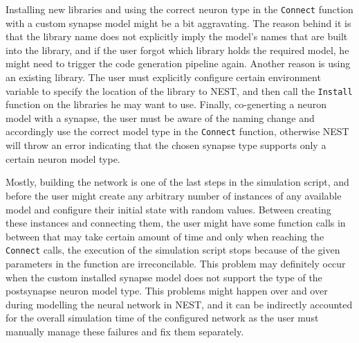   Installing new libraries and using the correct neuron type in the \texttt{Connect} function with a custom synapse model might be a bit aggravating. The reason behind it is that the library name does not explicitly imply the model's names that are built into the library, and if the user forgot which library holds the required model, he might need to trigger the code generation pipeline again. Another reason is using an existing library. The user must explicitly configure certain environment variable to specify the location of the library to NEST, and then call the \texttt{Install} function on the libraries he may want to use. Finally,  co-generting a neuron model with a synapse, the user must be aware of the naming change and accordingly use the correct model type in the \texttt{Connect} function, otherwise NEST will throw an error indicating that the chosen synapse type supports only a certain neuron model type.
  
  Mostly, building the network is one of the last steps in the simulation script, and before the user might create any arbitrary number of instances of any available model and configure their initial state with random values. Between creating these instances and connecting them, the user might have some function calls in between that may take certain amount of time and only when reaching the \texttt{Connect} calls, the execution of the simulation script stops because of the given parameters in the function are irreconcilable. This problem may definitely occur when the custom installed synapse model does not support the type of the postsynapse neuron model type.  This problems might happen over and over during modelling the neural network in NEST, and it can be indirectly accounted for the overall simulation time of the configured network as the user must manually manage these failures and fix them separately.

